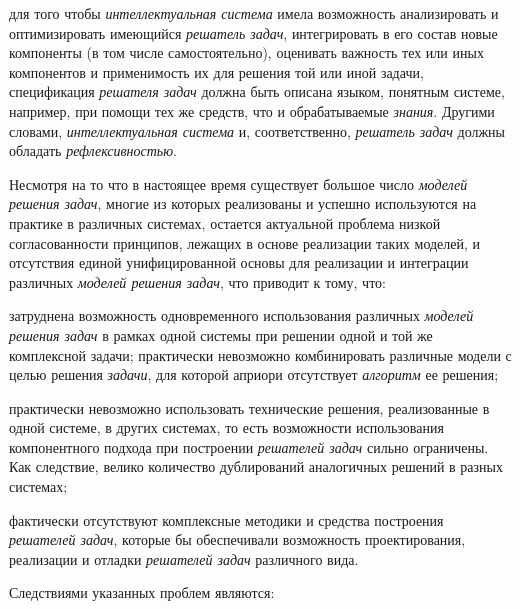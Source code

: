 \begin{textitemize}
	\item для того чтобы \textit{интеллектуальная система} имела возможность анализировать и оптимизировать имеющийся \textit{решатель задач}, интегрировать в его состав новые компоненты (в том числе самостоятельно), оценивать важность тех или иных компонентов и применимость их для решения той или иной задачи, спецификация \textit{решателя задач} должна быть описана языком, понятным системе, например, при помощи тех же средств, что и обрабатываемые \textit{знания}. Другими словами, \textit{интеллектуальная система} и, соответственно, \textit{решатель задач} должны обладать \textit{рефлексивностью}.
\end{textitemize}

Несмотря на то что в настоящее время существует большое число \textit{моделей решения задач}, многие из которых реализованы и успешно используются на практике в различных системах, остается актуальной проблема низкой согласованности принципов, лежащих в основе реализации таких моделей, и отсутствия единой унифицированной основы для реализации и интеграции различных \textit{моделей решения задач}, что приводит к тому, что:

\begin{textitemize}
	\item затруднена возможность одновременного использования различных \textit{моделей решения задач} в рамках одной системы при решении одной и той же комплексной задачи; практически невозможно комбинировать различные модели с целью решения \textit{задачи}, для которой априори отсутствует \textit{алгоритм} ее решения;
	\item практически невозможно использовать технические решения, реализованные в одной системе, в других системах, то есть возможности использования компонентного подхода при построении \textit{решателей задач} сильно ограничены. Как следствие, велико количество дублирований аналогичных решений в разных системах;
	\item фактически отсутствуют комплексные методики и средства построения \textit{решателей задач}, которые бы обеспечивали возможность проектирования, реализации и отладки \textit{решателей задач} различного вида.
\end{textitemize}

Следствиями указанных проблем являются:


